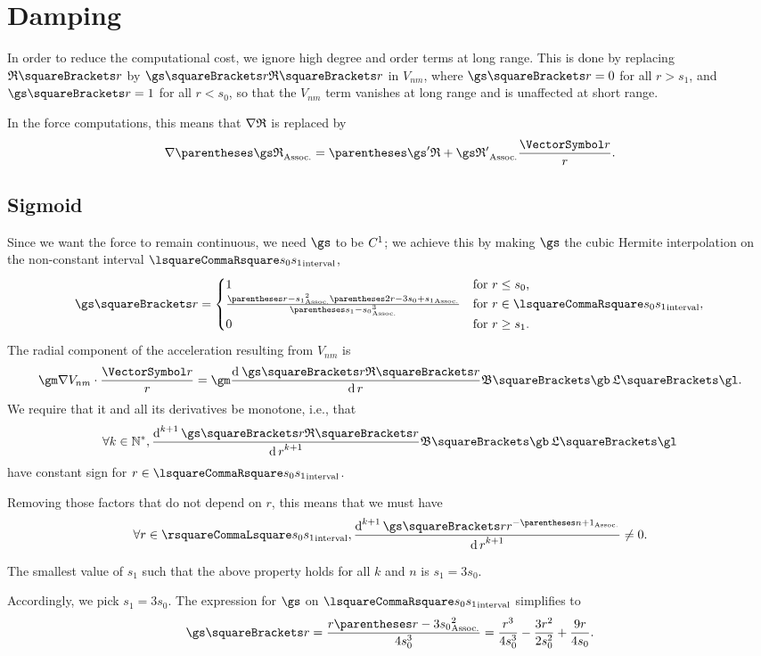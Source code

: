 \documentclass[10pt, a4paper, twoside]{basestyle}
\begin{document}
\section*{Damping}
In order to reduce the computational cost, we ignore high degree and order terms at long range.
This is done by replacing $\mathfrak R\of{r}$ by $\gs\of r \mathfrak R\of r$ in $V_{nm}$, where
$\gs\of r = 0$ for all $r>s_1$, and $\gs\of r = 1$ for all $r<s_0$, so that the $V_{nm}$ term
vanishes at long range and is unaffected at short range.

In the force computations, this means that $\grad\mathfrak R$ is replaced by\[
\grad \pa{\gs\mathfrak R} = \pa{\gs'\mathfrak R + \gs\mathfrak R'} \frac \vr r\text.
\]

\subsection*{Sigmoid}
Since we want the force to remain continuous, we need $\gs$ to be $\Cont[1]$; we achieve this by
making $\gs$ the cubic Hermite interpolation on the non-constant interval $\intclos {s_0} {s_1}$,
\[
\gs\of r=
\begin{cases}
1 &\text{for }r \leq s_0\text, \\
\frac{\pa{r-s_1}^2\pa{2r-3s_0+s_1}}{\pa{s_1-s_0}^3} &\text{for }r \in \intclos {s_0} {s_1}\text, \\
0 &\text{for }r \geq s_1\text.
\end{cases}
\]
The radial component of the acceleration resulting from $V_{nm}$ is 
\[
\gm\InnerProduct {\grad V_{nm}}{\frac \vr r} = \gm \deriv r {{\gs\of r \mathfrak R\of r}}{\mathfrak B\of \gb}\,{\mathfrak L\of \gl}\text.
\]
We require that it and all its derivatives be monotone, i.e., that
\[
\forall k \in \Positives, \deriv[k+1] r {\gs\of r \mathfrak R\of r}{\mathfrak B\of \gb}\,{\mathfrak L\of \gl}
\]
have constant sign for $r \in \intclos {s_0} {s_1}$.

Removing those factors that do not depend on $r$, this means that we must have
\[
\forall r \in \intopen{s_0} {s_1}, \deriv[k+1] r {\gs\of r r^{-\pa{n+1}}} \neq 0\text.
\]

\begin{lemma}
The smallest value of $s_1$ such that the above property holds for all $k$ and $n$ is $s_1 = 3s_0$.
\end{lemma}
Accordingly, we pick $s_1=3s_0$.
The expression for $\gs$ on $\intclos {s_0} {s_1}$ simplifies to\[
\gs\of r = \frac{r \pa{r-3s_0}^2} {4 s_0^3} = \frac{r^3}{4 s_0^3} - \frac{3 r^2}{2s_0^2} + \frac{9r}{4s_0}\text.
\]
\end{document}
